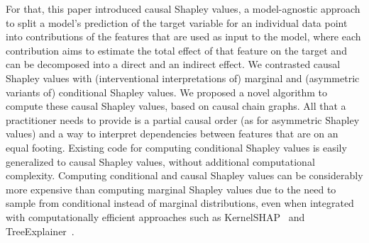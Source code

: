 \documentclass{article}
\newcommand{\comment}[1]{{\color{red} #1}}
\begin{document}
For that, this paper introduced causal Shapley values, a model-agnostic approach to split a model's prediction of the target variable for an individual data point into contributions of the features that are used as input to the model, where each contribution aims to estimate the total effect of that feature on the target and can be decomposed into a direct and an indirect effect. We contrasted causal Shapley values with (interventional interpretations of) marginal and (asymmetric variants of) conditional Shapley values.
We proposed a novel algorithm to compute these causal Shapley values, based on causal chain graphs. All that a practitioner needs to provide is a partial causal order (as for asymmetric Shapley values) and a way to interpret dependencies between features that are on an equal footing.
Existing code for computing conditional Shapley values is easily generalized to causal Shapley values, without additional computational complexity. Computing conditional and causal Shapley values can be considerably more expensive than computing marginal Shapley values due to the need to sample from conditional instead of marginal distributions, even when integrated with computationally efficient approaches such as KernelSHAP~\cite{lundberg2017unified} and TreeExplainer~\cite{lundberg2020local}.
\end{document}
